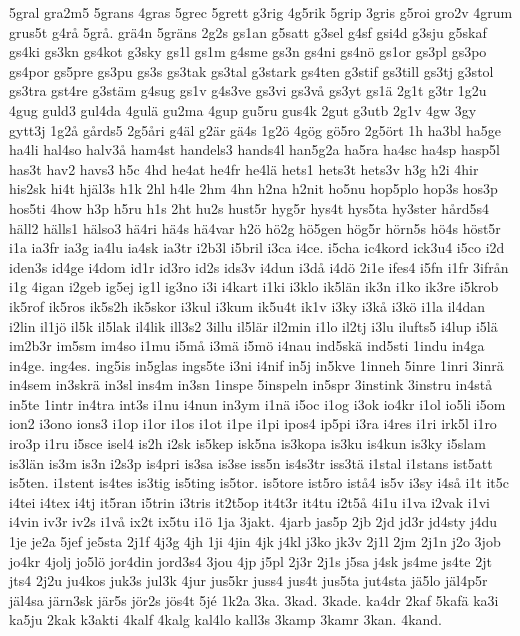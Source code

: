 {5gral
gra2m5
5grans
4gras
5grec
5grett
g3rig
4g5rik
5grip
3gris
g5roi
gro2v
4grum
grus5t
g4rå
5grå.
grä4n
5gräns
2g2s
gs1an
g5satt
g3sel
g4sf
gsi4d
g3sju
g5skaf
gs4ki
gs3kn
gs4kot
g3sky
gs1l
gs1m
g4sme
gs3n
gs4ni
gs4nö
gs1or
gs3pl
gs3po
gs4por
gs5pre
gs3pu
gs3s
gs3tak
gs3tal
g3stark
gs4ten
g3stif
gs3till
gs3tj
g3stol
gs3tra
gst4re
g3stäm
g4sug
gs1v
g4s3ve
gs3vi
gs3vå
gs3yt
gs1ä
2g1t
g3tr
1g2u
4gug
guld3
gul4da
4gulä
gu2ma
4gup
gu5ru
gus4k
2gut
g3utb
2g1v
4gw
3gy
gytt3j
1g2å
gårds5
2g5åri
g4äl
g2är
gä4s
1g2ö
4gög
gö5ro
2g5ört
1h
ha3bl
ha5ge
ha4li
hal4so
halv3å
ham4st
handels3
hands4l
han5g2a
ha5ra
ha4sc
ha4sp
hasp5l
has3t
hav2
havs3
h5c
4hd
he4at
he4fr
he4lä
hets1
hets3t
hets3v
h3g
h2i
4hir
his2sk
hi4t
hjäl3s
h1k
2hl
h4le
2hm
4hn
h2na
h2nit
ho5nu
hop5plo
hop3s
hos3p
hos5ti
4how
h3p
h5ru
h1s
2ht
hu2s
hust5r
hyg5r
hys4t
hys5ta
hy3ster
hård5s4
häll2
hälls1
hälso3
hä4ri
hä4s
hä4var
h2ö
hö2g
hö5gen
hög5r
hörn5s
hö4s
höst5r
i1a
ia3fr
ia3g
ia4lu
ia4sk
ia3tr
i2b3l
i5bril
i3ca
i4ce.
i5cha
ic4kord
ick3u4
i5co
i2d
iden3s
id4ge
i4dom
id1r
id3ro
id2s
ids3v
i4dun
i3då
i4dö
2i1e
ifes4
i5fn
i1fr
3ifrån
i1g
4igan
i2geb
ig5ej
ig1l
ig3no
i3i
i4kart
i1ki
i3klo
ik5län
ik3n
i1ko
ik3re
i5krob
ik5rof
ik5ros
ik5s2h
ik5skor
i3kul
i3kum
ik5u4t
ik1v
i3ky
i3kå
i3kö
i1la
il4dan
i2lin
il1jö
il5k
il5lak
il4lik
ill3s2
3illu
il5lär
il2min
i1lo
il2tj
i3lu
ilufts5
i4lup
i5lä
im2b3r
im5sm
im4so
i1mu
i5må
i3mä
i5mö
i4nau
ind5skä
ind5sti
1indu
in4ga
in4ge.
ing4es.
ing5is
in5glas
ings5te
i3ni
i4nif
in5j
in5kve
1inneh
5inre
1inri
3inrä
in4sem
in3skrä
in3sl
ins4m
in3sn
1inspe
5inspeln
in5spr
3instink
3instru
in4stå
in5te
1intr
in4tra
int3s
i1nu
i4nun
in3ym
i1nä
i5oc
i1og
i3ok
io4kr
i1ol
io5li
i5om
ion2
i3ono
ions3
i1op
i1or
i1os
i1ot
i1pe
i1pi
ipos4
ip5pi
i3ra
i4res
i1ri
irk5l
i1ro
iro3p
i1ru
i5sce
isel4
is2h
i2sk
is5kep
isk5na
is3kopa
is3ku
is4kun
is3ky
i5slam
is3län
is3m
is3n
i2s3p
is4pri
is3sa
is3se
iss5n
is4s3tr
iss3tä
i1stal
i1stans
ist5att
is5ten.
i1stent
is4tes
is3tig
is5ting
is5tor.
is5tore
ist5ro
istå4
is5v
i3sy
i4så
i1t
it5c
i4tei
i4tex
i4tj
it5ran
i5trin
i3tris
it2t5op
it4t3r
it4tu
i2t5å
4i1u
i1va
i2vak
i1vi
i4vin
iv3r
iv2s
i1vå
ix2t
ix5tu
i1ö
1ja
3jakt.
4jarb
jas5p
2jb
2jd
jd3r
jd4sty
j4du
1je
je2a
5jef
je5sta
2j1f
4j3g
4jh
1ji
4jin
4jk
j4kl
j3ko
jk3v
2j1l
2jm
2j1n
j2o
3job
jo4kr
4jolj
jo5lö
jor4din
jord3s4
3jou
4jp
j5pl
2j3r
2j1s
j5sa
j4sk
js4me
js4te
2jt
jts4
2j2u
ju4kos
juk3s
jul3k
4jur
jus5kr
juss4
jus4t
jus5ta
jut4sta
jä5lo
jäl4p5r
jäl4sa
järn3sk
jär5s
jör2s
jös4t
5jé
1k2a
3ka.
3kad.
3kade.
ka4dr
2kaf
5kafä
ka3i
ka5ju
2kak
k3akti
4kalf
4kalg
kal4lo
kall3s
3kamp
3kamr
3kan.
4kand.
}
